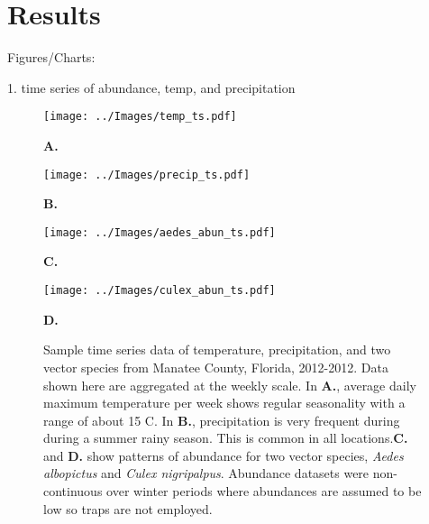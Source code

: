 \section{Results}

Figures/Charts: 

1. time series of abundance, temp, and precipitation
\begin{figure}[p]

		\begin{minipage}[]{.51\textwidth}
			\texttt{[image: ../Images/temp\_ts.pdf]}
			
			\hspace{4.3cm}\textbf{A.}\\
		\end{minipage}
		\begin{minipage}[]{.47\textwidth}
			\texttt{[image: ../Images/precip\_ts.pdf]}
			
			\hspace{4.4cm}\textbf{B.}\\
		\end{minipage}
	
	
		\begin{minipage}[]{.5\textwidth}
			\texttt{[image: ../Images/aedes\_abun\_ts.pdf]}
			
			\hspace{4.3cm}\textbf{C.}\\
		\end{minipage}
		\begin{minipage}[]{.5\textwidth}
			\texttt{[image: ../Images/culex\_abun\_ts.pdf]}
			
			\hspace{4.5cm}\textbf{D.}\\
		\end{minipage}
		
	\label{fig: ts_plots}
	\caption{Sample time series data of temperature, precipitation, and two vector species from Manatee County, Florida, 2012-2012. Data shown here are aggregated at the weekly scale. In \textbf{A.}, average daily maximum temperature per week shows regular seasonality with a range of about 15 \degree C. In \textbf{B.}, precipitation is very frequent during during a summer rainy season. This is common in all locations.\textbf{C.} and \textbf{D.} show patterns of abundance for two vector species, \textit{Aedes albopictus} and \textit{Culex nigripalpus}. Abundance datasets were non-continuous over winter periods where abundances are assumed to be low so traps are not employed.}

\end{figure}

